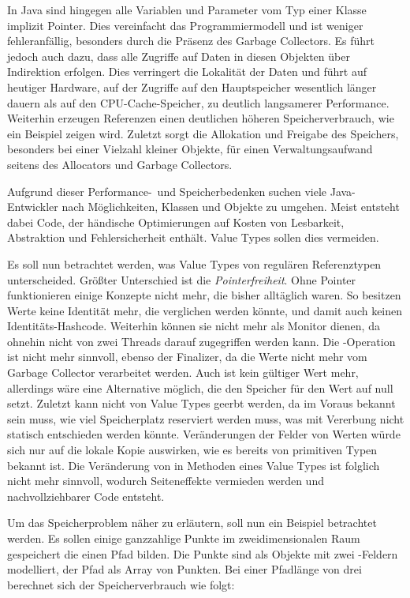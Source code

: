 In Java sind hingegen alle Variablen und Parameter vom Typ einer Klasse implizit Pointer.
Dies vereinfacht das Programmiermodell und ist weniger fehleranfällig, besonders durch die Präsenz des Garbage Collectors.
Es führt jedoch auch dazu, dass alle Zugriffe auf Daten in diesen Objekten über Indirektion erfolgen.
Dies verringert die Lokalität der Daten und führt auf heutiger Hardware, auf der Zugriffe auf den Hauptspeicher wesentlich länger dauern als auf den CPU-Cache-Speicher, zu deutlich langsamerer Performance. %
Weiterhin erzeugen Referenzen einen deutlichen höheren Speicherverbrauch, wie ein Beispiel zeigen wird. %
Zuletzt sorgt die Allokation und Freigabe des Speichers, besonders bei einer Vielzahl kleiner Objekte, für einen Verwaltungsaufwand seitens des Allocators und Garbage Collectors.

Aufgrund dieser Performance-\ und Speicherbedenken suchen viele Java-Entwickler nach Möglichkeiten, Klassen und Objekte zu umgehen.
Meist entsteht dabei Code, der händische Optimierungen auf Kosten von Lesbarkeit, Abstraktion und Fehlersicherheit enthält.
Value Types sollen dies vermeiden.

Es soll nun betrachtet werden, was Value Types von regulären Referenztypen unterscheided.
Größter Unterschied ist die \emph{Pointerfreiheit}.
Ohne Pointer funktionieren einige Konzepte nicht mehr, die bisher alltäglich waren.
So besitzen Werte keine Identität mehr, die verglichen werden könnte, und damit auch keinen Identitäts-Hashcode.
Weiterhin können sie nicht mehr als Monitor dienen, da ohnehin nicht von zwei Threads darauf zugegriffen werden kann.
Die -Operation ist nicht mehr sinnvoll, ebenso der Finalizer, da die Werte nicht mehr vom Garbage Collector verarbeitet werden.
Auch  ist kein gültiger Wert mehr, allerdings wäre eine Alternative möglich, die den Speicher für den Wert auf null setzt.
Zuletzt kann nicht von Value Types geerbt werden, da im Voraus bekannt sein muss, wie viel Speicherplatz reserviert werden muss, was mit Vererbung nicht statisch entschieden werden könnte.
Veränderungen der Felder von Werten würde sich nur auf die lokale Kopie auswirken, wie es bereits von primitiven Typen bekannt ist.
Die Veränderung von  in Methoden eines Value Types ist folglich nicht mehr sinnvoll, wodurch Seiteneffekte vermieden werden und nachvollziehbarer Code entsteht.


Um das Speicherproblem näher zu erläutern, soll nun ein Beispiel betrachtet werden.
Es sollen einige ganzzahlige Punkte im zweidimensionalen Raum gespeichert die einen Pfad bilden.
Die Punkte sind als Objekte mit zwei -Feldern modelliert, der Pfad als Array von Punkten.
Bei einer Pfadlänge von drei berechnet sich der Speicherverbrauch wie folgt:

